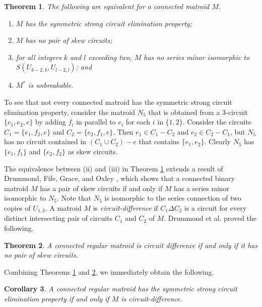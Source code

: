\documentclass[12pt,reqno]{amsart}
\newtheorem{theorem}{Theorem}[section]
\newtheorem{corollary}[theorem]{Corollary}
\theoremstyle{definition}
\theoremstyle{remark}
\numberwithin{equation}{section}
\begin{document}
\begin{theorem}\label{main}
    The following are equivalent for a connected matroid $M$.    
    \begin{enumerate}[label=(\roman*)]
        \item $M$ has the symmetric strong circuit elimination property; 
        \item $M$ has no pair of skew circuits;
        \item for all integers $k$ and $l$ exceeding two, $M$ has no series minor isomorphic to $S(U_{k-2,k},U_{l-2,l})$; and
        \item $M^*$ is unbreakable. 
    \end{enumerate}
\end{theorem}

To see that not every connected matroid has the symmetric strong circuit elimination property, consider the matroid $N_5$ that is obtained from a $3$-circuit $\{e_1, e_2,e\}$ by adding $f_i$ in parallel to $e_i$ for each $i$ in $\{1,2\}$. 
Consider the circuits $C_1=\{e_1, f_2,e\}$ and $C_2=\{e_2, f_1,e\}$. 
Then $e_1\in C_1-C_2$ and $e_2\in C_2-C_1$, but $N_5$ has no circuit contained in $(C_1 \cup C_2) - e$ that contains $\{e_1,e_2\}$. 
Clearly $N_5$ has $\{e_1,f_1\}$ and $\{e_2,f_2\}$ as skew circuits.

The equivalence between (ii) and (iii) in Theorem \ref{main} extends a result of Drummond, Fife, Grace, and Oxley \cite[Proposition 15]{cd}, which shows that a connected binary matroid $M$ has a pair of skew circuits if and only if $M$ has a series minor isomorphic to $N_5$. 
Note that $N_5$ is isomorphic to the series connection of two copies of $U_{1,3}$.   
A matroid $M$ is \textit{circuit-difference} if $C_1\Delta C_2$ is a circuit for every distinct intersecting pair of circuits $C_1$ and $C_2$ of $M$.   
Drummond et al. \cite[Theorem 1]{cd} proved the following. 

\begin{theorem}\label{regcd}
    A connected regular matroid is circuit difference if and only if it has no pair of skew circuits. 
\end{theorem}

\noindent Combining Theorems \ref{main} and \ref{regcd}, we immediately obtain the following. 

\begin{corollary}
    A connected regular matroid has the symmetric strong circuit elimination property if and only if $M$ is circuit-difference. 
\end{corollary}
\end{document}
